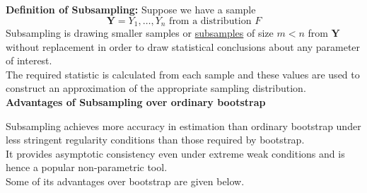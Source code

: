 \documentclass[a4paper, 11pt]{article}
\begin{document}
\textbf{Definition of Subsampling: } Suppose we have a sample $$\mathbf{Y} = Y_1, \ldots, Y_n \mbox{ from a distribution } F$$
Subsampling  is drawing smaller samples or \underline{subsamples} of size $m < n$ from $\mathbf{Y}$ without replacement in order to draw statistical conclusions about any parameter of interest.\\
The required statistic is calculated from each sample and these values are used to construct an approximation of the appropriate sampling distribution.\\


\textbf{Advantages of Subsampling over ordinary bootstrap}

 Subsampling achieves more accuracy in estimation than ordinary bootstrap under less stringent regularity conditions than those required by bootstrap.\\
It provides asymptotic consistency even under extreme weak conditions and is hence a popular non-parametric tool.\\
Some of its  advantages over bootstrap are given below.\\
\end{document}
